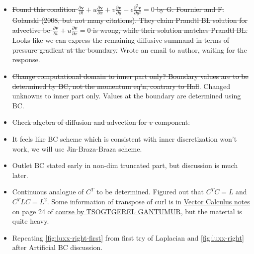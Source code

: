 \documentclass{article}
\numberwithin{equation}{section}
\begin{document}
{\begin{itemize}
    \item  \st{Found this condition $\frac{\partial \boldsymbol{v}}{\partial t}+u \frac{\partial \boldsymbol{v}}{\partial x}+v \frac{\partial \boldsymbol{v}}{\partial y}-\epsilon \frac{\partial^2 \boldsymbol{v}}{\partial y^2}=0$ by G. Fournier and F. Golanski (2008, but not many citations). They claim Prandtl BL solution for advective bc $\frac{\partial \boldsymbol{v}}{\partial t} + u\frac{\partial \boldsymbol{v}}{\partial x}=0$ is wrong, while their solution matches Prandtl BL. Looks like we can express the remaining diffusive summand in terms of pressure gradient at the boundary.} Wrote an email to author, waiting for the response. 
    \item \st{Change computational domain to inner part only? Boundary values are to be determined by BC, not the momentum eq'n, contrary to Hall}\cite{Hall:1980}. Changed unknowns to inner part only. Values at the boundary are determined using BC. 
    \item \st{Check algebra of diffusion and advection for $v$ component.} 
    \item It feels like BC scheme which is consistent with inner discretization won't work, we will use Jin-Braza-Braza scheme. 
    \item Outlet BC stated early in non-dim truncated part, but discussion is much later.
    \item Continuous analogue of $C^T$ to be determined. Figured out that $C^TC=L$ and $C^TLC=L^2$. Some information of transpose of curl is in \href{https://www.math.mcgill.ca/gantumur/math248f19/vectorcalc.pdf}{Vector Calculus notes} on page 24 of \href{https://www.math.mcgill.ca/gantumur/math248f19/}{course by TSOGTGEREL GANTUMUR}, but the material is quite heavy.
    \item Repeating \cref{fig:luxx-right-first} from first try of Laplacian and \cref{fig:luxx-right} after Artificial BC discussion.
  \end{itemize}
}
\end{document}
